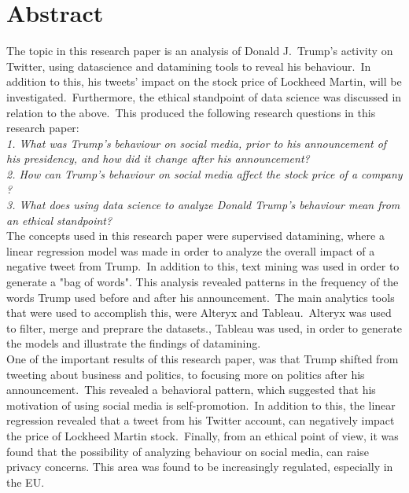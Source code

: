 \documentclass[12pt]{article}
\begin{document}
\color{NavyBlue} \tableofcontents \color{black}
\thispagestyle{empty} %
 \cleardoublepage
\setcounter{page}{1}%


\cleardoublepage%


\section{Abstract} %
The topic in this research paper is an analysis of Donald J.\ Trump's activity on Twitter, using datascience and datamining tools to reveal his behaviour.\ In addition to this, his tweets' impact on the stock price of Lockheed Martin, will be investigated.\ Furthermore, the ethical standpoint of data science was discussed in relation to the above.\ This produced the following research questions in this research paper:  \\

\textit{1. What was Trump's behaviour on social media, prior to his announcement of his presidency, and how did it change after his announcement?}\\

\textit{2. How can Trump's behaviour on social media affect the stock price of a company ?} \\

\textit{3. What does using data science to analyze Donald Trump's behaviour mean from an ethical standpoint?}\\
 
The concepts used in this research paper were supervised datamining, where a linear regression model was made in order to analyze the overall impact of a negative tweet from Trump.\ In addition to this, text mining was used in order to generate a "bag of words". This analysis  revealed patterns in the frequency of the words Trump used before and after his announcement.\ The main analytics tools that were used to accomplish this, were Alteryx and Tableau.\ Alteryx was used to filter, merge and preprare the datasets., Tableau was used, in order to generate the models and illustrate the findings of datamining. \\

One of the important results of this research paper, was that Trump shifted from tweeting about business and politics, to focusing more on politics after his announcement.\ This revealed a behavioral pattern, which suggested that his motivation of using social media is self-promotion.\ In addition to this, the linear regression revealed that a tweet from his Twitter account, can negatively impact the price of Lockheed Martin stock.\ Finally, from an ethical point of view, it was found that the possibility of analyzing behaviour on social media, can raise privacy concerns. This area was found to be increasingly regulated,  especially in the EU.
 
\end{document}
